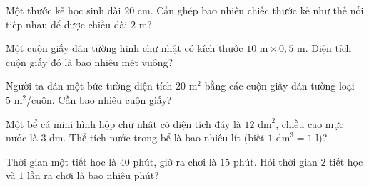 \begin{ex}
  Một thước kẻ học sinh dài $20\text{ cm}$. Cần ghép bao nhiêu chiếc thước kẻ như thế nối tiếp nhau để được chiều dài $2\text{ m}$?
\end{ex}

\begin{ex}
  Một cuộn giấy dán tường hình chữ nhật có kích thước $10\text{ m} \times 0{,}5\text{ m}$. Diện tích cuộn giấy đó là bao nhiêu mét vuông?
\end{ex}

\begin{ex}
  Người ta dán một bức tường diện tích $20\text{ m}^2$ bằng các cuộn giấy dán tường loại $5\text{ m}^2$/cuộn. Cần bao nhiêu cuộn giấy?
\end{ex}

\begin{ex}
  Một bể cá mini hình hộp chữ nhật có diện tích đáy là $12\text{ dm}^2$, chiều cao mực nước là $3\text{ dm}$. Thể tích nước trong bể là bao nhiêu lít (biết $1\text{ dm}^3 = 1\text{ l}$)?
\end{ex}

\begin{ex}
  Thời gian một tiết học là $40\text{ phút}$, giờ ra chơi là $15\text{ phút}$. Hỏi thời gian $2$ tiết học và $1$ lần ra chơi là bao nhiêu phút?
\end{ex}
